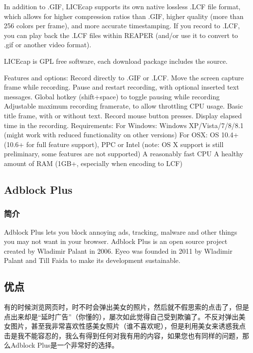 \documentclass[paper=a4,fontsize=11pt]{article}
\begin{document}
	In addition to .GIF, LICEcap supports its own native lossless .LCF file format, which allows for higher compression ratios than .GIF, higher quality (more than 256 colors per frame), and more accurate timestamping. If you record to .LCF, you can play back the .LCF files within REAPER (and/or use it to convert to .gif or another video format). 
	
	LICEcap is GPL free software, each download package includes the source. 
	
	Features and options:
	Record directly to .GIF or .LCF.
	Move the screen capture frame while recording.
	Pause and restart recording, with optional inserted text messages.
	Global hotkey (shift+space) to toggle pausing while recording
	Adjustable maximum recording framerate, to allow throttling CPU usage.
	Basic title frame, with or without text.
	Record mouse button presses.
	Display elapsed time in the recording.
	Requirements:
	For Windows: Windows XP/Vista/7/8/8.1 (might work with reduced functionality on other versions)
	For OSX: OS 10.4+ (10.6+ for full feature support), PPC or Intel (note: OS X support is still preliminary, some features are not supported)
	A reasonably fast CPU
	A healthy amount of RAM (1GB+, especially when encoding to LCF)
	
	\subsection{Adblock Plus}
	
	\subsubsection{简介}
	
	Adblock Plus lets you block annoying ads, tracking, malware and other things you may not want in your browser. Adblock Plus is an open source project created by Wladimir Palant in 2006. Eyeo was founded in 2011 by Wladimir Palant and Till Faida to make its development sustainable.
	
	
	\subsection{优点}
	
	有的时候浏览网页时，时不时会弹出美女的照片，然后就不假思索的点击了，但是点出来却是“延时广告”（你懂的），屡次如此觉得自己受到欺骗了。不反对弹出美女图片，甚至我非常喜欢性感美女照片（谁不喜欢呢），但是利用美女来诱惑我点击是我不能容忍的，我么有得到任何对我有用的内容，如果您也有同样的问题，那么Adblock Plus是一个非常好的选择。	
	
\end{document}
